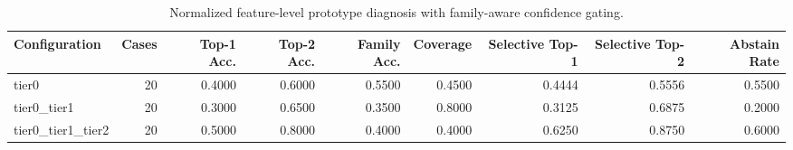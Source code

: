 \begin{table}[t]
\centering
\caption{Normalized feature-level prototype diagnosis with family-aware confidence gating.}
\label{tab:dice_stressor_hierarchical_diagnosis}
\footnotesize
\begin{tabular}{lrrrrrrrr}
\toprule
Configuration & Cases & Top-1 Acc. & Top-2 Acc. & Family Acc. & Coverage & Selective Top-1 & Selective Top-2 & Abstain Rate \\
\midrule
tier0 & 20 & 0.4000 & 0.6000 & 0.5500 & 0.4500 & 0.4444 & 0.5556 & 0.5500 \\
tier0_tier1 & 20 & 0.3000 & 0.6500 & 0.3500 & 0.8000 & 0.3125 & 0.6875 & 0.2000 \\
tier0_tier1_tier2 & 20 & 0.5000 & 0.8000 & 0.4000 & 0.4000 & 0.6250 & 0.8750 & 0.6000 \\
\bottomrule
\end{tabular}

\end{table}
